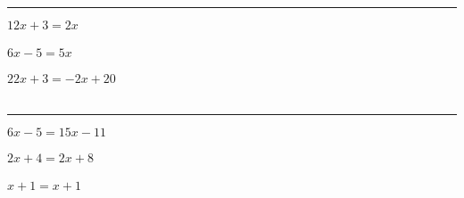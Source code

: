 \documentclass[10pt]{article}
\newcommand{\horrule}[1]{\rule{\linewidth}{#1}} %
\begin{document}
\horrule{1px}

\begin{multicols}{3}
  $12x + 3 = 2x$ \\
  \vspace{2cm} \\

  $6x - 5 = 5x$ \\
  \vspace{2cm}\\

  $22x + 3 = -2x + 20$ \\
  \vspace{2cm}\\
\end{multicols}

\horrule{1px}

\begin{multicols}{3}
  $6x - 5 = 15x - 11$ \\
  \vspace{1cm}\\
  $2x +  4 = 2x + 8$ \\
  \vspace{1cm}\\
  $x +  1 = x + 1$\\



\end{multicols}
\end{document}
